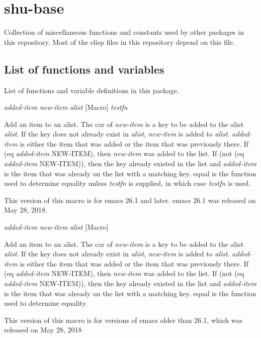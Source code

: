 \eject
\section{shu-base}


Collection of miscellaneous functions  and constants used by other
packages in this repository.  Most of the elisp files in this repository
depend on this file.


\subsection{List of functions and variables}

List of functions and variable definitions in this package.



\vspace{1em}
\noindent
{}
\usebox{\funcname}\emph{added-item} \emph{new-item} \emph{alist}
 \hfill [Macro]
\hspace*{\wd\funcname}\emph{testfn}

\begin{doc-string}
Add an item to an alist.  The car of \emph{new-item} is a key to be added to the
alist \emph{alist}.  If the key does not already exist in \emph{alist}, \emph{new-item} is added to
\emph{alist}.  \emph{added-item} is either the item that was added or the item that was
previously there.  If (eq \emph{added-item} NEW-ITEM), then \emph{new-item} was added to the
list.  If (not (eq \emph{added-item} NEW-ITEM)), then the key already existed in the
list and \emph{added-item} is the item that was already on the list with a matching
key.  equal is the function used to determine equality unless \emph{testfn} is
supplied, in which case \emph{testfn} is used.

This version of this macro is for emacs 26.1 and later.  emacs 26.1 was released
on May 28, 2018.
\end{doc-string}

\vspace{1em}
\noindent
{}
\usebox{\funcname}\emph{added-item} \emph{new-item} \emph{alist}
 \hfill [Macro]

\begin{doc-string}
Add an item to an alist.  The car of \emph{new-item} is a key to be added to
the alist \emph{alist}.  If the key does not already exist in \emph{alist}, \emph{new-item} is added
to \emph{alist}.  \emph{added-item} is either the item that was added or the item that was
previously there.  If (eq \emph{added-item} NEW-ITEM), then \emph{new-item} was added to the
list.  If (not (eq \emph{added-item} NEW-ITEM)), then the key already existed in the
list and \emph{added-item} is the item that was already on the list with a matching
key.  equal is the function used to determine equality.

This version of this macro is for versions of emacs older than 26.1, which was
released on May 28, 2018
\end{doc-string}


